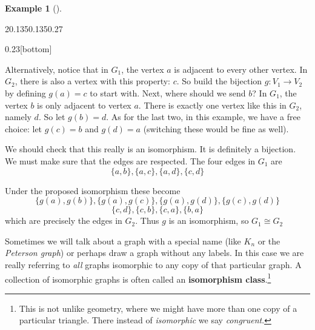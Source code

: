 \documentclass[10pt,]{book}
\newcommand{\terminology}[1]{\textbf{#1}}
\theoremstyle{plain}
\theoremstyle{definition}
\theoremstyle{definition}
\newtheorem{example}[theorem]{Example}
\theoremstyle{definition}
\numberwithin{equation}{chapter}
\newcommand{\vtx}[2]{node[fill,circle,inner sep=0pt, minimum size=4pt,label=#1:#2]{}}
\newcommand{\va}[1]{\vtx{above}{#1}}
\newcommand{\vb}[1]{\vtx{below}{#1}}
\newcommand{\vr}[1]{\vtx{right}{#1}}
\newcommand{\vl}[1]{\vtx{left}{#1}}
\begin{document}
\begin{example}[]
\begin{sidebyside}{2}{0.135}{0.135}{0.27}
\begin{sbspanel}{0.23}[bottom]
{{
}
}
\end{sbspanel}
\end{sidebyside}
\par
\hypertarget{p-61}{}%
Alternatively, notice that in \(G_1\), the vertex \(a\) is adjacent to every other vertex. In \(G_2\), there is also a vertex with this property: \(c\). So build the bijection \(g:V_1 \to V_2\) by defining \(g(a) = c\) to start with. Next, where should we send \(b\)? In \(G_1\), the vertex \(b\) is only adjacent to vertex \(a\). There is exactly one vertex like this in \(G_2\), namely \(d\). So let \(g(b) = d\). As for the last two, in this example, we have a free choice: let \(g(c) = b\) and \(g(d) = a\) (switching these would be fine as well).%
\par
\hypertarget{p-62}{}%
We should check that this really is an isomorphism. It is definitely a bijection. We must make sure that the edges are respected. The four edges in \(G_1\) are%
\begin{equation*}
\{a,b\}, \{a,c\}, \{a,d\}, \{c,d\}
\end{equation*}
%
\par
\hypertarget{p-63}{}%
Under the proposed isomorphism these become%
\begin{equation*}
\{g(a), g(b)\}, \{g(a), g(c)\}, \{g(a), g(d)\}, \{g(c), g(d)\}
\end{equation*}
%
\begin{equation*}
\{c,d\}, \{c,b\}, \{c,a\}, \{b,a\}
\end{equation*}
which are precisely the edges in \(G_2\). Thus \(g\) is an isomorphism, so \(G_1 \cong G_2\)%
\end{example}
\hypertarget{p-64}{}%
Sometimes we will talk about a graph with a special name (like \(K_n\) or the \emph{Peterson graph}) or perhaps draw a graph without any labels. In this case we are really referring to \emph{all} graphs isomorphic to any copy of that particular graph. A collection of isomorphic graphs is often called an \terminology{isomorphism class}.\footnote{This is not unlike geometry, where we might have more than one copy of a particular triangle. There instead of \emph{isomorphic} we say \emph{congruent}.\label{fn-1}}%
\end{document}

